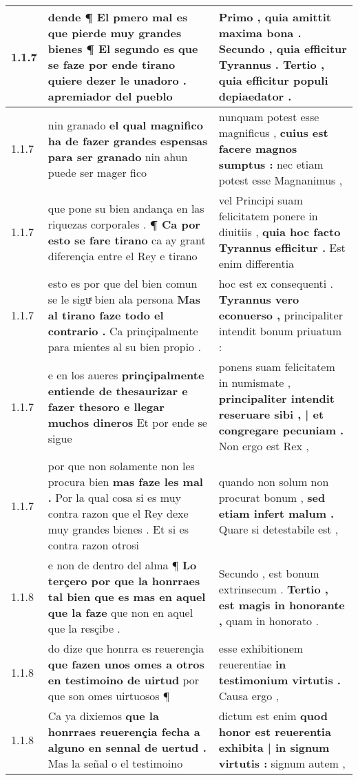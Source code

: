 \begin{tabular}{|p{1cm}|p{6.5cm}|p{6.5cm}|}
1.1.7 & dende ¶ El pmero mal es que pierde muy grandes bienes ¶ \textbf{ El segundo es que se faze por ende tirano quiere dezer le unadoro . } apremiador del pueblo & Primo , quia amittit maxima bona . \textbf{ Secundo , quia efficitur Tyrannus . } Tertio , quia efficitur populi depiaedator . \\\hline
1.1.7 & nin granado \textbf{ el qual magnifico ha de fazer grandes espensas para ser granado } nin ahun puede ser mager fico & nunquam potest esse magnificus , \textbf{ cuius est facere magnos sumptus : } nec etiam potest esse Magnanimus , \\\hline
1.1.7 & que pone su bien andança en las riquezas corporales . \textbf{ ¶ Ca por esto se fare tirano } ca ay grant diferençia entre el Rey e tirano & vel Principi suam felicitatem ponere in diuitiis , \textbf{ quia hoc facto Tyrannus efficitur . } Est enim differentia \\\hline
1.1.7 & esto es por que del bien comun se le siguͤ bien ala persona \textbf{ Mas al tirano faze todo el contrario . } Ca prinçipalmente para mientes al su bien propio . & hoc est ex consequenti . \textbf{ Tyrannus vero econuerso , } principaliter intendit bonum priuatum : \\\hline
1.1.7 & e en los aueres \textbf{ prinçipalmente entiende de thesaurizar e fazer thesoro e llegar muchos dineros } Et por ende se sigue & ponens suam felicitatem in numismate , \textbf{ principaliter intendit reseruare sibi , | et congregare pecuniam . } Non ergo est Rex , \\\hline
1.1.7 & por que non solamente non les procura bien \textbf{ mas faze les mal . } Por la qual cosa si es muy contra razon que el Rey dexe muy grandes bienes . Et si es contra razon otrosi & quando non solum non procurat bonum , \textbf{ sed etiam infert malum . } Quare si detestabile est , \\\hline
1.1.8 & e non de dentro del alma ¶ \textbf{ Lo terçero por que la honrraes tal bien que es mas en aquel que la faze } que non en aquel que la resçibe . & Secundo , est bonum extrinsecum . \textbf{ Tertio , est magis in honorante , } quam in honorato . \\\hline
1.1.8 & do dize que honrra es reuerençia \textbf{ que fazen unos omes a otros en testimoino de uirtud } por que son omes uirtuosos ¶ & esse exhibitionem reuerentiae \textbf{ in testimonium virtutis . } Causa ergo , \\\hline
1.1.8 & Ca ya dixiemos \textbf{ que la honrraes reuerençia fecha a alguno en sennal de uertud . } Mas la señal o el testimoino & dictum est enim \textbf{ quod honor est reuerentia exhibita | in signum virtutis : } signum autem , \\\hline

\end{tabular}
